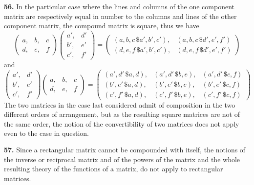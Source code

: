 \documentclass[12pt,a4paper]{article}
\theoremstyle{definition}
\begin{document}
\medskip
\noindent\textbf{56.} In the particular case where the lines and columns of the one component matrix are respectively equal in number to the columns and lines of the other component matrix, the compound matrix is square, thus we have
\[
\begin{pmatrix} a, & b, & c \\ d, & e, & f \end{pmatrix}
\begin{pmatrix} a', & d' \\ b', & e' \\ c', & f' \end{pmatrix}
=
\begin{pmatrix}
(a,b,c\,\$a',b',c'), & (a,b,c\,\$d',e',f') \\
(d,e,f\,\$a',b',c'), & (d,e,f\,\$d',e',f')
\end{pmatrix}
\]
and
\[
\begin{pmatrix} a', & d' \\ b', & e' \\ c', & f' \end{pmatrix}
\begin{pmatrix} a, & b, & c \\ d, & e, & f \end{pmatrix}
=
\begin{pmatrix}
(a',d'\,\$a,d), & (a',d'\,\$b,e), & (a',d'\,\$c,f) \\
(b',e'\,\$a,d), & (b',e'\,\$b,e), & (b',e'\,\$c,f) \\
(c',f'\,\$a,d), & (c',f'\,\$b,e), & (c',f'\,\$c,f)
\end{pmatrix}
\]
The two matrices in the case last considered admit of composition in the two different orders of arrangement, but as the resulting square matrices are not of the same order, the notion of the convertibility of two matrices does not apply even to the case in question.

\medskip
\noindent\textbf{57.} Since a rectangular matrix cannot be compounded with itself, the notions of the inverse or reciprocal matrix and of the powers of the matrix and the whole resulting theory of the functions of a matrix, do not apply to rectangular matrices.
\end{document}
